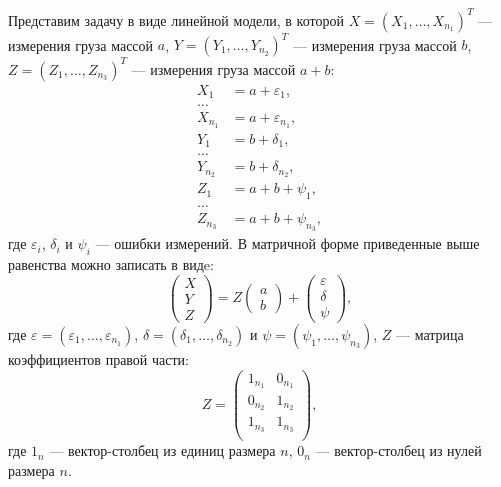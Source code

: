 Представим задачу в виде линейной модели, в которой $X = \left ( X_1, \dots, X_{n_1} \right )^T$ --- измерения груза массой $a$, $Y = \left ( Y_1, \dots, Y_{n_2} \right )^T$ ---
измерения груза массой $b$, $Z = \left ( Z_1, \dots, Z_{n_3} \right )^T$ --- измерения груза массой $a + b$:
\begin{align*}
    X_1     & =  a + \varepsilon_1 , \\
    \dots \\
    X_{n_1} & = a + \varepsilon_{n_1} , \\
    Y_1     & = b + \delta_1 , \\
    \dots \\
    Y_{n_2} & = b + \delta_{n_2} , \\
    Z_1     & = a + b + \psi_1 , \\
    \dots \\
    Z_{n_3} & = a + b + \psi_{n_3} ,
\end{align*}
где $\varepsilon_i$, $\delta_i$ и $\psi_i$ --- ошибки измерений. В матричной форме приведенные выше равенства можно записать в видe:
\begin{equation}
    \begin{pmatrix}
        X \\
        Y \\
        Z
    \end{pmatrix}
    =
    Z
    \begin{pmatrix}
        a \\
        b
    \end{pmatrix}
    +
    \begin{pmatrix}
        \varepsilon \\
        \delta      \\
        \psi
    \end{pmatrix} ,
\end{equation}
где $\varepsilon = ( \varepsilon_1, \dots, \varepsilon_{n_1})$, $\delta = ( \delta_1, \dots, \delta_{n_2})$ и $\psi = ( \psi_1, \dots, \psi_{n_3})$, $Z$ --- матрица коэффициентов
правой части:
\begin{equation}
    Z =
    \begin{pmatrix}
        1_{n_1} & 0_{n_1} \\
        0_{n_2} & 1_{n_2} \\
        1_{n_3} & 1_{n_3} \\
    \end{pmatrix}
    ,
\end{equation}
где $1_n$ --- вектор-столбец из единиц размера $n$, $0_n$ --- вектор-столбец из нулей размера $n$.
